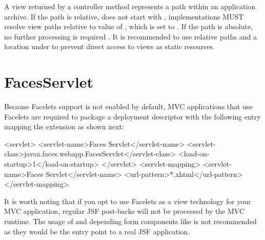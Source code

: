 A view returned by a controller method represents a path within an
application archive. If the path is relative, does not start with , implementations 
MUST resolve view paths relative to value of , 
which is set to . If the path is absolute, no further processing
is required . It is recommended to use relative paths and a 
location under  to prevent direct access to views as static resources.

\section{FacesServlet}
\label{faces_servlet}

Because Facelets support is not enabled by default, MVC applications that use Facelets are 
required to package a  deployment descriptor with the following entry
mapping the extension  as shown next:

\begin{listing}{1}
  <servlet>
      <servlet-name>Faces Servlet</servlet-name>
      <servlet-class>javax.faces.webapp.FacesServlet</servlet-class>
      <load-on-startup>1</load-on-startup>
  </servlet>
  <servlet-mapping>
      <servlet-name>Faces Servlet</servlet-name>
      <url-pattern>*.xhtml</url-pattern>
  </servlet-mapping>
\end{listing}

It is worth noting that if you opt to use Facelets as a view technology for your MVC application,
regular JSF post-backs will not be processed by the MVC runtime. The usage of 
and depending form components like  is not recommended as they would
be the entry point to a real JSF application.
